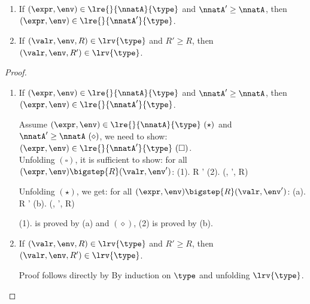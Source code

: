  \begin{thm}[Monotonicity]
  \label{mono}
  \begin{enumerate} 
   \item If  $(
     \expr, \env) \in  \lre{}{\nnatA}{ \type} $ and $\nnatA' \geq \nnatA$,  then  $  (
     \expr, \env) \in  \lre{}{\nnatA'}{ \type} $.
   \item   If  $(
     \valr,\env,  R) \in  \lrv{\type} $ and $R' \geq R$,  then  $ (
     \valr,\env, R') \in  \lrv{\type} $.
  \end{enumerate}
\end{thm}


\begin{proof}
\begin{enumerate} 
   \item If  
   $(\expr, \env) \in  \lre{}{\nnatA}{ \type} $ and $\nnatA' \geq \nnatA$,  then  
   $ (\expr, \env) \in  \lre{}{\nnatA'}{ \type} $.

     Assume $(\expr, \env) \in  \lre{}{\nnatA}{ \type}~(\star)$ and $\nnatA' \geq \nnatA~(\diamond)$, we need to show: $ (\expr, \env) \in  \lre{}{\nnatA'}{ \type}~(\square) $.\\
     Unfolding $(\square)$, it is sufficient to show: 
     for all $(\expr, \env) \bigstep{R} (\valr, \env')$:
     (1). R \leq \nnatA'
     (2). (\valr, \env', R) \in \lrv{\type}

     Unfolding $(\star)$, we get:
     for all $(\expr, \env) \bigstep{R} (\valr, \env')$:
     (a). R \leq \nnatA'
     (b). (\valr, \env', R) \in \lrv{\type}
     
     (1). is proved by (a) and $(\diamond)$, (2) is proved by (b). 


   \item   If  $(
     \valr,\env,  R) \in  \lrv{\type} $ and $R' \geq R$,  then  $ (
     \valr,\env, R') \in  \lrv{\type} $.


     Proof follows directly by By induction on $\type$ and unfolding $\lrv{\type}$.\\




  \end{enumerate}
\end{proof}
